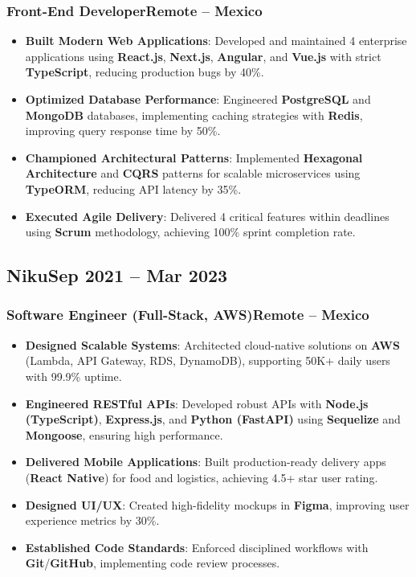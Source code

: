 \documentclass[a4paper,10pt]{article}
\newcommand{\kw}[1]{\textbf{\textcolor{keyword}{#1}}}
\newcommand{\tech}[1]{\textbf{\textcolor{tech}{#1}}}
\begin{document}
\subsubsection*{Front-End Developer\hfill Remote -- Mexico}
\begin{itemize}[noitemsep, leftmargin=*]
    \item \textbf{Built Modern Web Applications}: Developed and maintained 4 enterprise applications using \tech{React.js}, \tech{Next.js}, \tech{Angular}, and \tech{Vue.js} with strict \tech{TypeScript}, reducing production bugs by 40\%.
    \item \textbf{Optimized Database Performance}: Engineered \kw{PostgreSQL} and \kw{MongoDB} databases, implementing caching strategies with \tech{Redis}, improving query response time by 50\%.
    \item \textbf{Championed Architectural Patterns}: Implemented \kw{Hexagonal Architecture} and \kw{CQRS} patterns for scalable microservices using \tech{TypeORM}, reducing API latency by 35\%.
    \item \textbf{Executed Agile Delivery}: Delivered 4 critical features within deadlines using \kw{Scrum} methodology, achieving 100\% sprint completion rate.
\end{itemize}

\subsection*{Niku\hfill\textbf{Sep 2021 -- Mar 2023}}
\subsubsection*{Software Engineer (Full-Stack, AWS)\hfill Remote -- Mexico}
\begin{itemize}[noitemsep, leftmargin=*]
    \item \textbf{Designed Scalable Systems}: Architected cloud-native solutions on \tech{AWS} (Lambda, API Gateway, RDS, DynamoDB), supporting 50K+ daily users with 99.9\% uptime.
    \item \textbf{Engineered RESTful APIs}: Developed robust APIs with \tech{Node.js (TypeScript)}, \tech{Express.js}, and \tech{Python (FastAPI)} using \kw{Sequelize} and \kw{Mongoose}, ensuring high performance.
    \item \textbf{Delivered Mobile Applications}: Built production-ready delivery apps (\tech{React Native}) for food and logistics, achieving 4.5+ star user rating.
    \item \textbf{Designed UI/UX}: Created high-fidelity mockups in \tech{Figma}, improving user experience metrics by 30\%.
    \item \textbf{Established Code Standards}: Enforced disciplined workflows with \tech{Git}/\tech{GitHub}, implementing code review processes.
\end{itemize}
\end{document}
